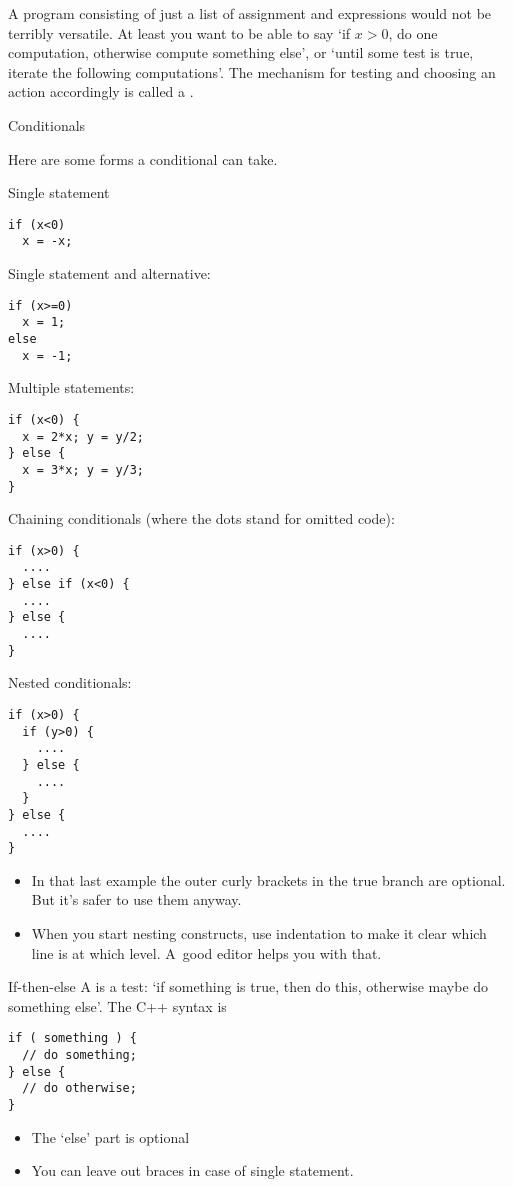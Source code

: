 
A program consisting of just a list of assignment and expressions
would not be terribly versatile. At least you want to be able to say
`if $x>0$, do one computation, otherwise compute something else', or `until some
test is true, iterate the following computations'. The mechanism for
testing and choosing an action accordingly is called a
.

 {Conditionals}
\label{sec:if}

Here are some forms a conditional can take.

Single statement
\begin{lstlisting}
if (x<0)
  x = -x;
\end{lstlisting}
Single statement and alternative:
\begin{lstlisting}
if (x>=0)
  x = 1;
else
  x = -1;
\end{lstlisting}
Multiple statements:
\begin{lstlisting}
if (x<0) {
  x = 2*x; y = y/2;
} else {
  x = 3*x; y = y/3;
}
\end{lstlisting}
Chaining conditionals (where the dots stand for omitted code):
\begin{lstlisting}
if (x>0) {
  ....
} else if (x<0) {
  ....
} else {
  ....
}
\end{lstlisting}
Nested conditionals:
\begin{lstlisting}
if (x>0) {
  if (y>0) {
    ....
  } else {
    ....
  }
} else {
  ....
}
\end{lstlisting}
\begin{itemize}
\item
  In that last example the outer curly brackets in the true branch are
  optional. But it's safer to use them anyway.
\item When you start nesting constructs, use indentation to make it
  clear which line is at which level. A~good editor helps you with that.
\end{itemize}

\begin{slide}{If-then-else}
  \label{sl:ifthenelse}
  A  is a test: `if something is true, then do
  this, otherwise maybe do something else'. The C++ syntax is
\begin{lstlisting}
if ( something ) {
  // do something;
} else {
  // do otherwise;
}
\end{lstlisting}
\begin{itemize}
\item The `else' part is optional
\item You can leave out braces in case of single statement.
\end{itemize}
\end{slide}

